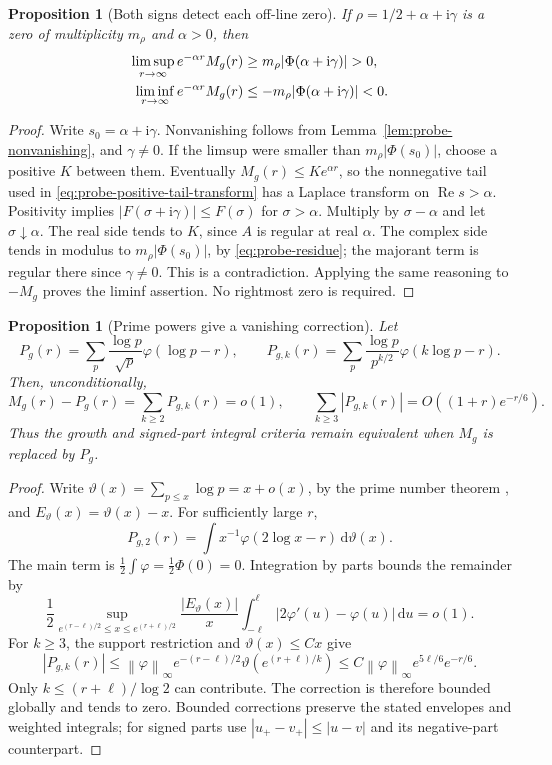 \documentclass[11pt]{article}
\numberwithin{equation}{section}
\newtheorem{proposition}[theorem]{Proposition}
\theoremstyle{definition}
\theoremstyle{remark}
\newcommand{\Rea}{\operatorname{Re}}
\newcommand{\ii}{\mathrm i}
\newcommand{\norm}[1]{\left\lVert #1\right\rVert}
\newcommand{\dd}{\,\mathrm d}
\begin{document}
\begin{proposition}[Both signs detect each off-line zero]
\label{prop:probe-signed-oscillation}
If \(\rho=1/2+\alpha+\ii\gamma\) is a zero of multiplicity \(m_\rho\)
and \(\alpha>0\), then
\begin{align}
 \limsup_{r\to\infty}e^{-\alpha r}M_g(r)
    &\ge m_\rho|\Phi(\alpha+\ii\gamma)|>0,\notag\\
 \liminf_{r\to\infty}e^{-\alpha r}M_g(r)
    &\le-m_\rho|\Phi(\alpha+\ii\gamma)|<0.
 \label{eq:probe-signed-oscillation}
\end{align}
\end{proposition}
\begin{proof}
Write \(s_0=\alpha+\ii\gamma\). Nonvanishing follows from
Lemma~\ref{lem:probe-nonvanishing}, and \(\gamma\ne0\).
If the limsup were smaller than \(m_\rho|\Phi(s_0)|\), choose a positive
\(K\) between them. Eventually \(M_g(r)\le Ke^{\alpha r}\), so the
nonnegative tail used in \eqref{eq:probe-positive-tail-transform} has a
Laplace transform on \(\Rea s>\alpha\). Positivity implies
\(|F(\sigma+\ii\gamma)|\le F(\sigma)\) for \(\sigma>\alpha\).
Multiply by \(\sigma-\alpha\) and let \(\sigma\downarrow\alpha\).
The real side tends to \(K\), since \(A\) is regular at real \(\alpha\).
The complex side tends in modulus to \(m_\rho|\Phi(s_0)|\), by
\eqref{eq:probe-residue}; the majorant term is regular there since
\(\gamma\ne0\). This is a contradiction. Applying the same reasoning
to \(-M_g\) proves the liminf assertion. No rightmost zero is required.
\end{proof}

\begin{proposition}[Prime powers give a vanishing correction]
\label{prop:probe-primes-only}
Let
\[
 P_g(r)=\sum_p\frac{\log p}{\sqrt p}\varphi(\log p-r),\qquad
 P_{g,k}(r)=\sum_p\frac{\log p}{p^{k/2}}\varphi(k\log p-r).
\]
Then, unconditionally,
\[
 M_g(r)-P_g(r)=\sum_{k\ge2}P_{g,k}(r)=o(1),\qquad
 \sum_{k\ge3}|P_{g,k}(r)|=O((1+r)e^{-r/6}).
\]
Thus the growth and signed-part integral criteria remain equivalent
when \(M_g\) is replaced by \(P_g\).
\end{proposition}
\begin{proof}
Write \(\vartheta(x)=\sum_{p\le x}\log p=x+o(x)\), by the prime
number theorem \cite[\S27.12]{DLMF}, and \(E_\vartheta(x)=\vartheta(x)-x\).
For sufficiently large \(r\),
\[
 P_{g,2}(r)=\int x^{-1}\varphi(2\log x-r)\dd\vartheta(x).
\]
The main term is \(\frac12\int\varphi=\frac12\Phi(0)=0\).
Integration by parts bounds the remainder by
\[
 \frac12\sup_{e^{(r-\ell)/2}\le x\le e^{(r+\ell)/2}}
       \frac{|E_\vartheta(x)|}{x}
       \int_{-\ell}^{\ell}|2\varphi'(u)-\varphi(u)|\dd u=o(1).
\]
For \(k\ge3\), the support restriction and \(\vartheta(x)\le Cx\) give
\[
 |P_{g,k}(r)|\le\norm{\varphi}_\infty e^{-(r-\ell)/2}
             \vartheta(e^{(r+\ell)/k})
 \le C\norm{\varphi}_\infty e^{5\ell/6}e^{-r/6}.
\]
Only \(k\le(r+\ell)/\log2\) can contribute. The correction is
therefore bounded globally and tends to zero. Bounded corrections
preserve the stated envelopes and weighted integrals; for signed
parts use \(|u_+-v_+|\le|u-v|\) and its negative-part counterpart.
\end{proof}
\end{document}

